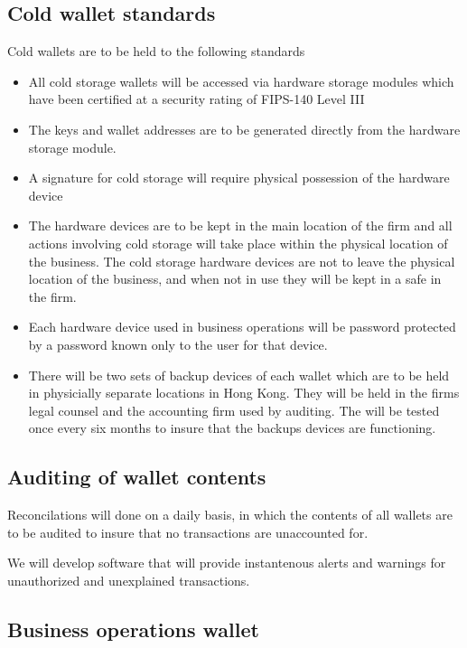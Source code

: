 \subsection{Cold wallet standards}

Cold wallets are to be held to the following standards

\begin{itemize}
  \item All cold storage wallets will be accessed via hardware storage
    modules which have been certified at a security rating of
    FIPS-140 Level III
 \item The keys and wallet addresses are to be generated directly from
   the hardware storage module.
 \item A signature for cold storage will require physical possession
   of the hardware device
 \item The hardware devices are to be kept in the main location of the
   firm and all actions involving cold storage will take place within
   the physical location of the business.  The cold storage hardware
   devices are not to leave the physical location of the business, and
   when not in use they will be kept in a safe in the firm.
 \item Each hardware device used in business operations will be
   password protected by a password known only to the user for that
   device.
 \item There will be two sets of backup devices of each wallet which
   are to be held in physicially separate locations in Hong Kong.
   They will be held in the firms legal counsel and the accounting
   firm used by auditing.  The will be tested once every six months to
   insure that the backups devices are functioning.
\end{itemize}

\subsection{Auditing of wallet contents}

Reconcilations will done on a daily basis, in which the contents of
all wallets are to be audited to insure that no transactions are
unaccounted for.

We will develop software that will provide instantenous alerts and
warnings for unauthorized and unexplained transactions.  

\subsection{Business operations wallet}

